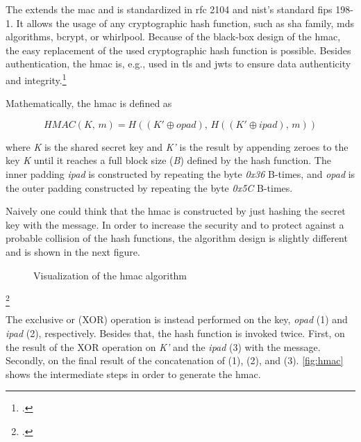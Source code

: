 The  extends the \gls{mac} and is standardized in \gls{rfc} 2104 and \gls{nist}'s standard \gls{fips} 198-1. It allows the usage of any cryptographic hash function, such as \gls{sha} family, \glspl{md} algorithms, bcrypt, or whirlpool. Because of the black-box design of the \gls{hmac}, the easy replacement of the used cryptographic hash function is possible. Besides authentication, the \gls{hmac} is, e.g., used in \gls{tls} and \glspl{jwt} to ensure data authenticity and integrity.\footcites[See][]{krawczyk1997rfc}[See][]{FIPS198}[See][14]{rfc5246}[See][8]{rfc7519}[See][3--4]{s2011rfc}

Mathematically, the \gls{hmac} is defined as

\begin{equation*}
	HMAC(K,\, m) = H((K' \oplus opad),\, H((K' \oplus ipad),\, m))
\end{equation*}

where \textit{K} is the shared secret key and \textit{K'} is the result by appending zeroes to the key \textit{K} until it reaches a full block size (\textit{B}) defined by the hash function. The inner padding \textit{ipad} is constructed by repeating the byte \textit{0x36} B-times, and \textit{opad} is the outer padding constructed by repeating the byte \textit{0x5C} B-times.

Naively one could think that the \gls{hmac} is constructed by just hashing the secret key with the message. In order to increase the security and to protect against a probable collision of the hash functions, the algorithm design is slightly different and is shown in the next figure.

\begin{figure}[hbt]
	\centering
	
	\caption[Visualization of the \gls{hmac} algorithm]{Visualization of the \gls{hmac} algorithm\footnotemark}
	\label{fig:hmac}
\end{figure}
\footcitetext[Source: diagram by author, based on][395]{eckert-it-sec-9}

The exclusive or (XOR) operation is instead performed on the key, \textit{opad} (1) and \textit{ipad} (2), respectively. Besides that, the hash function is invoked twice. First, on the result of the XOR operation on \textit{K'} and the \textit{ipad} (3) with the message. Secondly, on the final result of the concatenation of (1), (2), and (3). \autoref{fig:hmac} shows the intermediate steps in order to generate the \gls{hmac}.

